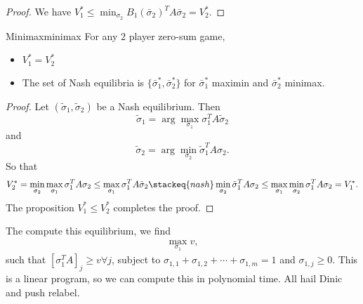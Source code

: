 \begin{proof}
     We have $V_1^*\leq \min_{\sigma_2} B_1(\bar\sigma_2) ^T A\bar\sigma_2=V_2^*.$
\end{proof}
\begin{atheorem}{Minimax}{minimax}
    For any $2$ player zero-sum game, \begin{itemize}
        \item $V_1^*=V_2^*$
        \item The set of Nash equilibria is $\{\bar\sigma_1^*,\bar\sigma_2^*\}$ for $\bar\sigma_1^*$ maximin and $\bar\sigma_2^*$ minimax. 
    \end{itemize}
\end{atheorem}
\begin{proof}
    Let $(\tilde{\sigma}_1,\tilde\sigma_2)$ be a Nash equilibrium. Then \[
    \tilde\sigma_1 = \arg \max_{\sigma_1} \sigma_1^T A\tilde\sigma_2
    \] 
     and \[
        \tilde\sigma_2 = \arg \min_{\sigma_2} \tilde\sigma_1^T A\sigma_2.
     \]
     So that \[
     V_2^* = \min_{\sigma_2} \max_{\sigma_1} \sigma_1^T A \sigma_2 \leq \max_{\sigma_1} \sigma_1^T A \tilde\sigma_2 \stackeq{nash}  \min_{\sigma_2} \tilde\sigma_1^T A \sigma_2  \leq \max_{\sigma_1}\min_{\sigma_2}\sigma_1^T A \sigma_2  = V_1^*.
     \]
     The proposition $V_1^*\leq V_2^*$ completes the proof.
\end{proof}
The compute this equilibrium, we find \begin{align*}
    \max_{\sigma_1}v,
\end{align*}
such that $[\sigma_1^TA]_j\geq v\forall j$, subject to $\sigma_{1,1}+\sigma_{1,2}+\cdots+\sigma_{1,m}=1$ and $\sigma_{1,j}\geq 0$. This is a linear program, so we can compute this in polynomial time. All hail Dinic and push relabel.

